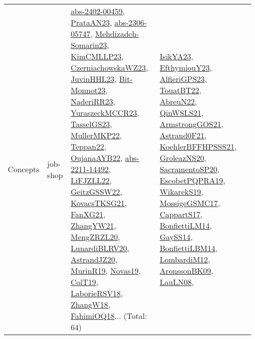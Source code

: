{\begin{longtable}{lp{3cm}>{\raggedright}p{6cm}>{\raggedright}p{6cm}p{8cm}}
Concepts & job-shop & \href{articles/abs-2402-00459.pdf}{abs-2402-00459}\cite{abs-2402-00459}, \href{articles/PrataAN23.pdf}{PrataAN23}\cite{PrataAN23}, \href{articles/abs-2306-05747.pdf}{abs-2306-05747}\cite{abs-2306-05747}, \href{papers/Mehdizadeh-Somarin23.pdf}{Mehdizadeh-Somarin23}\cite{Mehdizadeh-Somarin23}, \href{papers/KimCMLLP23.pdf}{KimCMLLP23}\cite{KimCMLLP23}, \href{articles/CzerniachowskaWZ23.pdf}{CzerniachowskaWZ23}\cite{CzerniachowskaWZ23}, \href{papers/JuvinHHL23.pdf}{JuvinHHL23}\cite{JuvinHHL23}, \href{papers/Bit-Monnot23.pdf}{Bit-Monnot23}\cite{Bit-Monnot23}, \href{articles/NaderiRR23.pdf}{NaderiRR23}\cite{NaderiRR23}, \href{articles/YuraszeckMCCR23.pdf}{YuraszeckMCCR23}\cite{YuraszeckMCCR23}, \href{papers/TasselGS23.pdf}{TasselGS23}\cite{TasselGS23}, \href{articles/MullerMKP22.pdf}{MullerMKP22}\cite{MullerMKP22}, \href{papers/Teppan22.pdf}{Teppan22}\cite{Teppan22}, \href{papers/OujanaAYB22.pdf}{OujanaAYB22}\cite{OujanaAYB22}, \href{articles/abs-2211-14492.pdf}{abs-2211-14492}\cite{abs-2211-14492}, \href{papers/LiFJZLL22.pdf}{LiFJZLL22}\cite{LiFJZLL22}, \href{papers/GeitzGSSW22.pdf}{GeitzGSSW22}\cite{GeitzGSSW22}, \href{papers/KovacsTKSG21.pdf}{KovacsTKSG21}\cite{KovacsTKSG21}, \href{articles/FanXG21.pdf}{FanXG21}\cite{FanXG21}, \href{articles/ZhangYW21.pdf}{ZhangYW21}\cite{ZhangYW21}, \href{articles/MengZRZL20.pdf}{MengZRZL20}\cite{MengZRZL20}, \href{articles/LunardiBLRV20.pdf}{LunardiBLRV20}\cite{LunardiBLRV20}, \href{articles/AstrandJZ20.pdf}{AstrandJZ20}\cite{AstrandJZ20}, \href{papers/MurinR19.pdf}{MurinR19}\cite{MurinR19}, \href{articles/Novas19.pdf}{Novas19}\cite{Novas19}, \href{papers/ColT19.pdf}{ColT19}\cite{ColT19}, \href{articles/LaborieRSV18.pdf}{LaborieRSV18}\cite{LaborieRSV18}, \href{articles/ZhangW18.pdf}{ZhangW18}\cite{ZhangW18}, \href{articles/FahimiOQ18.pdf}{FahimiOQ18}\cite{FahimiOQ18}... (Total: 64) & \href{articles/IsikYA23.pdf}{IsikYA23}\cite{IsikYA23}, \href{papers/EfthymiouY23.pdf}{EfthymiouY23}\cite{EfthymiouY23}, \href{articles/AlfieriGPS23.pdf}{AlfieriGPS23}\cite{AlfieriGPS23}, \href{papers/TouatBT22.pdf}{TouatBT22}\cite{TouatBT22}, \href{articles/AbreuN22.pdf}{AbreuN22}\cite{AbreuN22}, \href{articles/QinWSLS21.pdf}{QinWSLS21}\cite{QinWSLS21}, \href{papers/ArmstrongGOS21.pdf}{ArmstrongGOS21}\cite{ArmstrongGOS21}, \href{papers/Astrand0F21.pdf}{Astrand0F21}\cite{Astrand0F21}, \href{articles/KoehlerBFFHPSSS21.pdf}{KoehlerBFFHPSSS21}\cite{KoehlerBFFHPSSS21}, \href{papers/GroleazNS20.pdf}{GroleazNS20}\cite{GroleazNS20}, \href{articles/SacramentoSP20.pdf}{SacramentoSP20}\cite{SacramentoSP20}, \href{articles/EscobetPQPRA19.pdf}{EscobetPQPRA19}\cite{EscobetPQPRA19}, \href{articles/WikarekS19.pdf}{WikarekS19}\cite{WikarekS19}, \href{papers/MossigeGSMC17.pdf}{MossigeGSMC17}\cite{MossigeGSMC17}, \href{papers/CappartS17.pdf}{CappartS17}\cite{CappartS17}, \href{papers/BonfiettiLM14.pdf}{BonfiettiLM14}\cite{BonfiettiLM14}, \href{papers/GaySS14.pdf}{GaySS14}\cite{GaySS14}, \href{articles/BonfiettiLBM14.pdf}{BonfiettiLBM14}\cite{BonfiettiLBM14}, \href{articles/LombardiM12.pdf}{LombardiM12}\cite{LombardiM12}, \href{papers/AronssonBK09.pdf}{AronssonBK09}\cite{AronssonBK09}, \href{papers/LauLN08.pdf}{LauLN08}\cite{LauLN08}, 
\end{longtable}}
